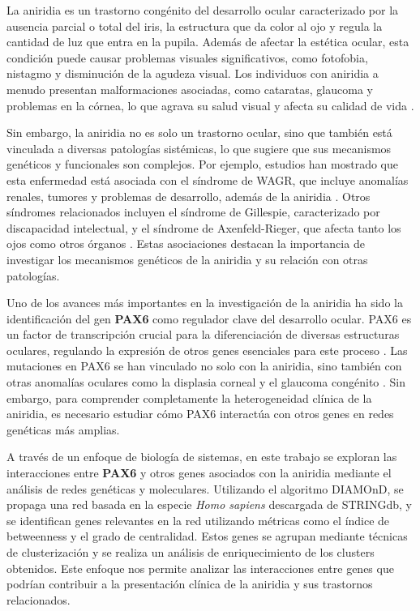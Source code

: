 La aniridia es un trastorno congénito del desarrollo ocular caracterizado por la ausencia parcial o total del iris, la estructura que da color al ojo y regula la cantidad de luz que entra en la pupila. Además de afectar la estética ocular, esta condición puede causar problemas visuales significativos, como fotofobia, nistagmo y disminución de la agudeza visual. Los individuos con aniridia a menudo presentan malformaciones asociadas, como cataratas, glaucoma y problemas en la córnea, lo que agrava su salud visual y afecta su calidad de vida \cite{Landsend2021}.

Sin embargo, la aniridia no es solo un trastorno ocular, sino que también está vinculada a diversas patologías sistémicas, lo que sugiere que sus mecanismos genéticos y funcionales son complejos. Por ejemplo, estudios han mostrado que esta enfermedad está asociada con el síndrome de WAGR, que incluye anomalías renales, tumores y problemas de desarrollo, además de la aniridia \cite{lopezrelacion}. Otros síndromes relacionados incluyen el síndrome de Gillespie, caracterizado por discapacidad intelectual, y el síndrome de Axenfeld-Rieger, que afecta tanto los ojos como otros órganos \cite{Law2011}. Estas asociaciones destacan la importancia de investigar los mecanismos genéticos de la aniridia y su relación con otras patologías.

Uno de los avances más importantes en la investigación de la aniridia ha sido la identificación del gen \textbf{PAX6} como regulador clave del desarrollo ocular. PAX6 es un factor de transcripción crucial para la diferenciación de diversas estructuras oculares, regulando la expresión de otros genes esenciales para este proceso \cite{robles_lopez_2012}. Las mutaciones en PAX6 se han vinculado no solo con la aniridia, sino también con otras anomalías oculares como la displasia corneal y el glaucoma congénito \cite{CalvaoPires2014}. Sin embargo, para comprender completamente la heterogeneidad clínica de la aniridia, es necesario estudiar cómo PAX6 interactúa con otros genes en redes genéticas más amplias.

A través de un enfoque de biología de sistemas, en este trabajo se exploran las interacciones entre \textbf{PAX6} y otros genes asociados con la aniridia mediante el análisis de redes genéticas y moleculares. Utilizando el algoritmo DIAMOnD, se propaga una red basada en la especie \textit{Homo sapiens} descargada de STRINGdb, y se identifican genes relevantes en la red utilizando métricas como el índice de betweenness y el grado de centralidad. Estos genes se agrupan mediante técnicas de clusterización y se realiza un análisis de enriquecimiento de los clusters obtenidos. Este enfoque nos permite analizar las interacciones entre genes que podrían contribuir a la presentación clínica de la aniridia y sus trastornos relacionados.

